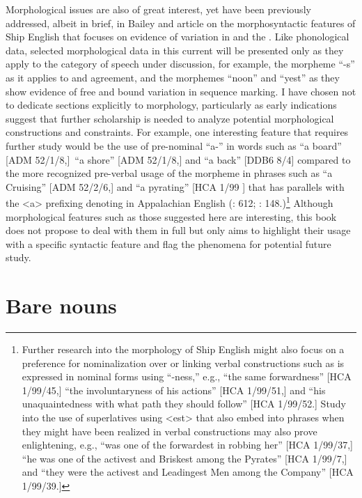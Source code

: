 Morphological issues are also of great interest, yet have been previously addressed, albeit in brief, in Bailey and  article on the morphosyntactic features of Ship English that focuses on evidence of variation in  and the . Like phonological data, selected morphological data in this current  will be presented only as they apply to the category of speech under discussion, for example, the morpheme “-s” as it applies to  and   agreement, and the morphemes “noon” and “yest” as they show evidence of free and bound variation in sequence marking. I have chosen not to dedicate sections explicitly to morphology, particularly as early indications suggest that further scholarship is needed to analyze potential morphological constructions and constraints. For example, one interesting feature that requires further study would be the use of pre-nominal “a-” in words such as “a board” [ADM 52/1/8,]~“a shore” [ADM 52/1/8,] and “a back” [DDB6 8/4] compared to the more recognized pre-verbal usage of the morpheme in phrases such as “a Cruising” [ADM 52/2/6,] and “a pyrating” [HCA 1/99 \citealt{Barbados1733}] that has parallels with the <a> prefixing denoting  in Appalachian English (\citealt{Hickey2004}: 612; \citealt{Montgomery2001}: 148.)\footnote{Further research into the morphology of Ship English might also focus on a preference for nominalization over  or linking verbal constructions such as is expressed in nominal forms using “-ness,” e.g., “the same forwardness” [HCA 1/99/45,] “the involuntaryness of his actions” [HCA 1/99/51,] and “his unaquaintedness with what path they should follow” [HCA 1/99/52.] Study into the use of  superlatives using <est> that also embed into  phrases when they might have been realized in verbal constructions may also prove enlightening, e.g., “was one of the forwardest in robbing her” [HCA 1/99/37,] “he was one of the activest and Briskest among the Pyrates” [HCA 1/99/7,] and “they were the activest and Leadingest Men among the Company” [HCA 1/99/39.]} Although morphological features such as those suggested here are interesting, this book does not propose to deal with them in full but only aims to highlight their usage with a specific syntactic feature and flag the phenomena for potential future study. 

\section{{Bare nouns}}%

